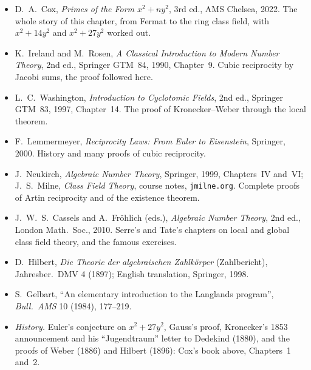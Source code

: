 \begin{itemize}
\item D.~A.~Cox, \emph{Primes of the Form $x^2+ny^2$}, 3rd ed., AMS Chelsea, 2022. The whole story of this chapter, from Fermat to the ring class
field, with $x^2+14y^2$ and $x^2+27y^2$ worked out.
\item K.~Ireland and M.~Rosen, \emph{A Classical Introduction to Modern Number Theory}, 2nd ed., Springer GTM~84, 1990, Chapter~9. Cubic reciprocity
by Jacobi sums, the proof followed here.
\item L.~C.~Washington, \emph{Introduction to Cyclotomic Fields}, 2nd ed., Springer GTM~83, 1997, Chapter~14. The proof of Kronecker--Weber through
the local theorem.
\item F.~Lemmermeyer, \emph{Reciprocity Laws: From Euler to Eisenstein}, Springer, 2000. History and many proofs of cubic reciprocity.
\item J.~Neukirch, \emph{Algebraic Number Theory}, Springer, 1999, Chapters~IV and~VI; J.~S.~Milne, \emph{Class Field Theory}, course notes,
\texttt{jmilne.org}. Complete proofs of Artin reciprocity and of the existence theorem.
\item J.~W.~S.~Cassels and A.~Fr\"ohlich (eds.), \emph{Algebraic Number Theory}, 2nd ed., London Math.\ Soc., 2010. Serre's and Tate's chapters on
local and global class field theory, and the famous exercises.
\item D.~Hilbert, \emph{Die Theorie der algebraischen Zahlk\"orper} (Zahlbericht), Jahresber.\ DMV 4 (1897); English translation, Springer, 1998.
\item S.~Gelbart, ``An elementary introduction to the Langlands program'', \emph{Bull.\ AMS} 10 (1984), 177--219.
\item \emph{History.} Euler's conjecture on $x^2+27y^2$, Gauss's proof, Kronecker's 1853 announcement and his
``Jugendtraum'' letter to Dedekind (1880), and the proofs of Weber (1886) and Hilbert (1896): Cox's book above, Chapters~1 and~2.
\end{itemize}
